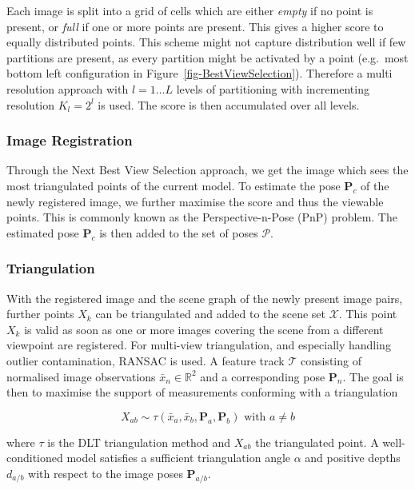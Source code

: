 \documentclass[conference,]{IEEEtran}
\begin{document}
Each image is split into a grid of cells which are either \emph{empty}
if no point is present, or \emph{full} if one or more points are
present. This gives a higher score to equally distributed points. This
scheme might not capture distribution well if few partitions are
present, as every partition might be activated by a point (e.g.~most
bottom left configuration in Figure~\ref{fig-BestViewSelection}).
Therefore a multi resolution approach with \(l=1\dots L\) levels of
partitioning with incrementing resolution \(K_l=2^l\) is used. The score
is then accumulated over all levels. \autocite{schönberger2016}

\hypertarget{image-registration}{%
\subsubsection{Image Registration}\label{image-registration}}

Through the Next Best View Selection approach, we get the image which
sees the most triangulated points of the current model. To estimate the
pose \(\mathbf{P}_c\) of the newly registered image, we further maximise
the score and thus the viewable points. This is commonly known as the
Perspective-n-Pose (PnP) \autocite{fischler1981} problem. The estimated
pose \(\mathbf{P}_c\) is then added to the set of poses \(\mathcal{P}\).
\autocite{schönberger2016}

\hypertarget{triangulation}{%
\subsubsection{Triangulation}\label{triangulation}}

With the registered image and the scene graph of the newly present image
pairs, further points \(X_k\) can be triangulated and added to the scene
set \(\mathcal{X}\). This point \(X_k\) is valid as soon as one or more
images covering the scene from a different viewpoint are registered. For
multi-view triangulation, and especially handling outlier contamination,
RANSAC is used. A feature track \(\mathcal{T}\) consisting of normalised
image observations \(\bar{x}_n\in\mathbb{R}^2\) and a corresponding pose
\(\mathbf{P}_n\). The goal is then to maximise the support of
measurements conforming with a triangulation

\[
X_{ab}\sim \tau(\bar{x}_a,\bar{x}_b,\mathbf{P}_a,\mathbf{P}_b)\text{ with } a\neq b
\]

where \(\tau\) is the DLT \autocite{hartley2004} triangulation method
and \(X_{ab}\) the triangulated point. A well-conditioned model
satisfies a sufficient triangulation angle \(\alpha\) and positive
depths \(d_{a/b}\) with respect to the image poses \(\mathbf{P}_{a/b}\).
\autocite{schönberger2016}
\end{document}
